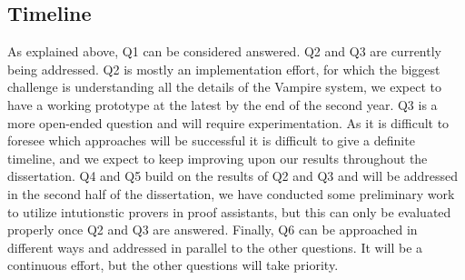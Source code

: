 \documentclass{article}
\theoremstyle{definition}
\theoremstyle{definition}
\theoremstyle{definition}
\theoremstyle{definition}
\theoremstyle{definition}
\theoremstyle{definition}
\theoremstyle{definition}
\newcommand{\0}{\mathbf 0}
\newcommand{\1}{\mathbf 1}
\newcounter{question}
\begin{document}
	\subsection{Timeline}


	As explained above, Q1 can be considered answered. Q2 and Q3 are currently being addressed. Q2 is mostly an implementation effort, for which the biggest challenge is understanding all the details of the Vampire system, we expect to have a working prototype at the latest by the end of the second year. Q3 is a more open-ended question and will require experimentation. As it is difficult to foresee which approaches will be successful it is difficult to give a definite timeline, and we expect to keep improving upon our results throughout the dissertation.
	Q4 and Q5 build on the results of Q2 and Q3 and will be addressed in the second half of the dissertation, we have conducted some preliminary work to utilize intutionstic provers in proof assistants, but this can only be evaluated properly once Q2 and Q3 are answered. Finally, Q6 can be approached in different ways and addressed in parallel to the other questions. It will be a continuous effort, but the other questions will take priority.
\end{document}
